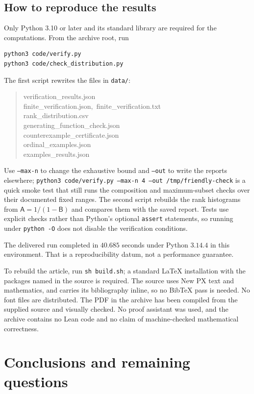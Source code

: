 \documentclass[11pt,letterpaper]{article}
\theoremstyle{definition}
\theoremstyle{remark}
\newcommand{\gfA}{\mathsf{A}}
\newcommand{\gfB}{\mathsf{B}}
\begin{document}
\subsection{How to reproduce the results}
Only Python 3.10 or later and its standard library are required for the
computations. From the archive root, run
\begin{lstlisting}[language=bash]
python3 code/verify.py
python3 code/check_distribution.py
\end{lstlisting}
The first script rewrites the files in \texttt{data/}:
\begin{quote}\small\ttfamily
verification\_results.json\\
finite\_verification.json,\ finite\_verification.txt\\
rank\_distribution.csv\\
generating\_function\_check.json\\
counterexample\_certificate.json\\
ordinal\_examples.json\\
examples\_results.json
\end{quote}
Use \texttt{--max-n} to change the exhaustive bound and \texttt{--out} to
write the reports elsewhere; \texttt{python3 code/verify.py --max-n 4 --out
/tmp/friendly-check} is a quick smoke test that still runs the composition
and maximum-subset checks over their documented fixed ranges. The second
script rebuilds the rank histograms from $\gfA=1/(1-\gfB)$ and compares them
with the saved report. Tests use explicit checks rather than
Python's optional \texttt{assert} statements, so running under
\texttt{python -O} does not disable the verification conditions.

The delivered run completed in $40.685$ seconds under Python $3.14.4$ in
this environment. That is a reproducibility datum, not a performance
guarantee.

To rebuild the article, run \texttt{sh build.sh}; a standard LaTeX
installation with the packages named in the source is required. The
source uses New PX text and mathematics, and carries its bibliography
inline, so no BibTeX pass is needed. No font files are distributed.
The PDF in the archive has been compiled from the supplied source and
visually checked. No proof assistant was used, and the archive contains no
Lean code and no claim of machine-checked mathematical correctness.

\section{Conclusions and remaining questions}\label{sec:conclusion}
\end{document}
